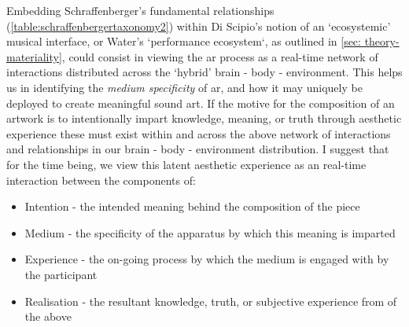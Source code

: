 Embedding Schraffenberger's fundamental relationships (\autoref{table:schraffenbergertaxonomy2}) within Di Scipio's notion of an `ecosystemic' musical interface, or Water's `performance ecosystem`, as outlined in \autoref{sec: theory-materiality}, could consist in viewing the \gls{ar} process as a real-time network of interactions distributed across the `hybrid' brain - body - environment. This helps us in identifying the \textit{medium specificity} of \gls{ar}, and how it may uniquely be deployed to create meaningful sound \gls{art}. If the motive for the composition of an artwork is to intentionally impart knowledge, meaning, or truth through aesthetic experience these must exist within and across the above network of interactions and relationships in our brain - body - environment distribution. I suggest that for the time being, we view this latent aesthetic experience as an real-time interaction between the components of:
\begin{itemize}
    \item Intention - the intended meaning behind the composition of the piece
    \item Medium - the specificity of the apparatus by which this meaning is imparted
    \item Experience - the on-going process by which the medium is engaged with by the participant
    \item Realisation - the resultant knowledge, truth, or subjective experience from of the above
\end{itemize}

